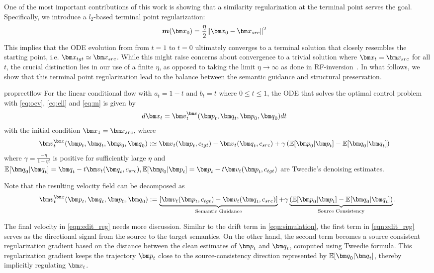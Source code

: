 One of the most important contributions of this work is showing that a similarity regularization at the terminal point serves the goal.
 Specifically, we introduce a
 $l_2$-based terminal point regularization:
 \begin{align}
 \m(\vx_0)=\frac{\eta}{2}\|\vx_0-\vx_{{src}}\|^2 \quad \label{eq:m}
 \end{align}
 This implies that the ODE evolution from 
from $t=1$ to $t=0$ ultimately converges to a terminal solution that closely resembles the starting point,
 i.e. $\vx_{tgt}\simeq \vx_{src}$.
 While this might raise concerns about convergence to a trivial solution where $\vx_t=\vx_{src}$ for all $t$,
the crucial distinction lies in our use of a finite 
$\eta$, as opposed to taking the limit $\eta\rightarrow \infty$ 
 as done in RF-inversion~\cite{rout2025semantic}.
 In what follows, we show that this terminal point regularization lead to the balance between the semantic guidance
 and structural preservation.
\begin{restatable}[]{prop}{rectflow}
\label{prop:rectflow}
    For the linear conditional flow with $a_t = 1-t$ and $b_t=t$ where $0\leq t \leq 1$, the ODE  that solves
    the optimal control problem with \eqref{eq:ocv}, \eqref{eq:ell} and \eqref{eq:m} is given by
\begin{align}
    d \vx_t &= \vv_t^\vx(\vp_t,\vq_t,\vp_0, \vq_0) dt
    \end{align}
    with the initial condition $\vx_1=\vx_{src}$, where
    \begin{align}
    \vv_t^\vx(\vp_t,\vq_t,\vp_0, \vq_0) &:\simeq \vv_t(\vp_t, c_{tgt}) - \vv_t(\vq_t, c_{src}) + \gamma
    \left(\mathbb{E}[\vp_0|\vp_t]-\mathbb{E}[\vq_0|\vq_t]\right) 
\end{align}
where $ \gamma = \frac{-\eta}{1-\eta t}$ is positive for sufficiently large $\eta$ and $\mathbb{E}[\vq_0|\vq_t] = \vq_t - t \vv_t(\vq_t, c_{src}),  \mathbb{E}[\vp_0|\vp_t] = \vp_t - t \vv_t(\vp_t, c_{tgt})$ are Tweedie's denoising estimates.
\end{restatable}
Note that the resulting velocity field can be decomposed as
\begin{align}
  \vv_t^\vx(\vp_t,\vq_t,\vp_0, \vq_0)  := \underbrace{[\vv_t(\vp_t, c_{tgt}) - \vv_t(\vq_t, c_{src})]}_{\text{Semantic Guidance}} + \gamma 
  \underbrace{(\mathbb{E}[\vp_0|\vp_t] - \mathbb{E}[\vq_0|\vq_t])}_{\text{Source Consistency}}.
   \label{eqn:edit_reg}
\end{align}

The final velocity in \eqref{eqn:edit_reg} needs more discussion. Similar to the drift term in \eqref{eqn:simulation},
the first term in \eqref{eqn:edit_reg}
serves as the directional signal from the source to the target semantics.
On the other hand, the second term
 becomes  a source consistent regularization gradient based on the distance between the clean estimates of $\vp_t$ and $\vq_t$, computed using Tweedie formula.
This regularization gradient keeps the trajectory $\vp_t$ close to the source-consistency direction represented by $\mathbb{E}[\vq_0|\vq_t]$, thereby implicitly regulating $\vx_t$.

